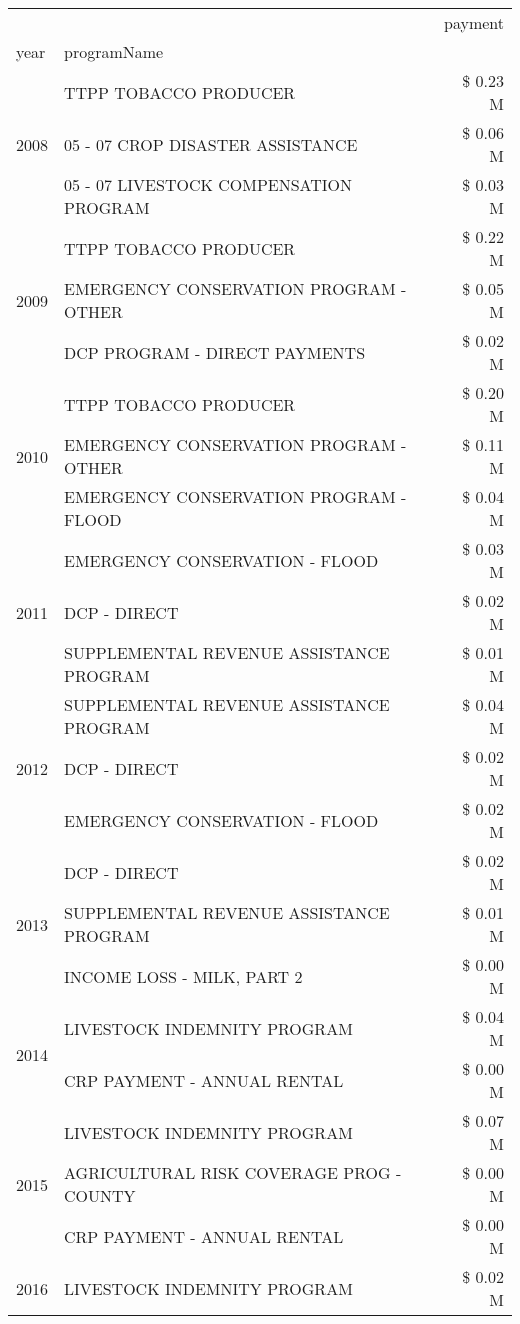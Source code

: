\begin{tabular}{llr}
\toprule
 &  & payment \\
year & programName &  \\
\midrule
\multirow[t]{3}{*}{2008} & TTPP TOBACCO PRODUCER & \$ 0.23 M \\
 & 05 - 07 CROP DISASTER ASSISTANCE & \$ 0.06 M \\
 & 05 - 07 LIVESTOCK COMPENSATION PROGRAM & \$ 0.03 M \\
\cline{1-3}
\multirow[t]{3}{*}{2009} & TTPP TOBACCO PRODUCER & \$ 0.22 M \\
 & EMERGENCY CONSERVATION PROGRAM - OTHER & \$ 0.05 M \\
 & DCP PROGRAM - DIRECT PAYMENTS & \$ 0.02 M \\
\cline{1-3}
\multirow[t]{3}{*}{2010} & TTPP TOBACCO PRODUCER & \$ 0.20 M \\
 & EMERGENCY CONSERVATION PROGRAM - OTHER & \$ 0.11 M \\
 & EMERGENCY CONSERVATION PROGRAM - FLOOD & \$ 0.04 M \\
\cline{1-3}
\multirow[t]{3}{*}{2011} & EMERGENCY CONSERVATION - FLOOD & \$ 0.03 M \\
 & DCP - DIRECT & \$ 0.02 M \\
 & SUPPLEMENTAL REVENUE ASSISTANCE PROGRAM & \$ 0.01 M \\
\cline{1-3}
\multirow[t]{3}{*}{2012} & SUPPLEMENTAL REVENUE ASSISTANCE PROGRAM & \$ 0.04 M \\
 & DCP - DIRECT & \$ 0.02 M \\
 & EMERGENCY CONSERVATION - FLOOD & \$ 0.02 M \\
\cline{1-3}
\multirow[t]{3}{*}{2013} & DCP - DIRECT & \$ 0.02 M \\
 & SUPPLEMENTAL REVENUE ASSISTANCE PROGRAM & \$ 0.01 M \\
 & INCOME LOSS - MILK, PART 2 & \$ 0.00 M \\
\cline{1-3}
\multirow[t]{2}{*}{2014} & LIVESTOCK INDEMNITY PROGRAM & \$ 0.04 M \\
 & CRP PAYMENT - ANNUAL RENTAL & \$ 0.00 M \\
\cline{1-3}
\multirow[t]{3}{*}{2015} & LIVESTOCK INDEMNITY PROGRAM & \$ 0.07 M \\
 & AGRICULTURAL RISK COVERAGE PROG - COUNTY & \$ 0.00 M \\
 & CRP PAYMENT - ANNUAL RENTAL & \$ 0.00 M \\
\cline{1-3}
\multirow[t]{3}{*}{2016} & LIVESTOCK INDEMNITY PROGRAM & \$ 0.02 M \\

\end{tabular}
